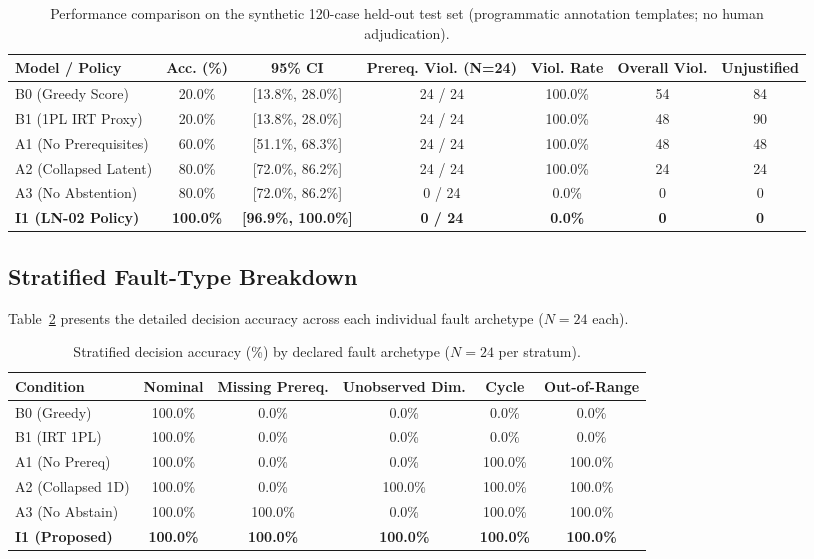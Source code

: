 \documentclass[11pt,a4paper]{article}
\begin{document}
\begin{table}[htbp]
\centering
\small
\caption{Performance comparison on the synthetic 120-case held-out test set (programmatic annotation templates; no human adjudication).}
\label{tab:holdout-main}
\begin{tabular}{lcccccc}
\toprule
\textbf{Model / Policy} & \textbf{Acc. (\%)} & \textbf{95\% CI} & \textbf{Prereq. Viol. (N=24)} & \textbf{Viol. Rate} & \textbf{Overall Viol.} & \textbf{Unjustified} \\
\midrule
B0 (Greedy Score)       & 20.0\% & [13.8\%, 28.0\%] & 24 / 24 & 100.0\% & 54 & 84 \\
B1 (1PL IRT Proxy)      & 20.0\% & [13.8\%, 28.0\%] & 24 / 24 & 100.0\% & 48 & 90 \\
A1 (No Prerequisites)   & 60.0\% & [51.1\%, 68.3\%] & 24 / 24 & 100.0\% & 48 & 48 \\
A2 (Collapsed Latent)   & 80.0\% & [72.0\%, 86.2\%] & 24 / 24 & 100.0\% & 24 & 24 \\
A3 (No Abstention)      & 80.0\% & [72.0\%, 86.2\%] &  0 / 24 &   0.0\% &  0 &  0 \\
\midrule
\textbf{I1 (LN-02 Policy)} & \textbf{100.0\%} & \textbf{[96.9\%, 100.0\%]} & \textbf{0 / 24} & \textbf{0.0\%} & \textbf{0} & \textbf{0} \\
\bottomrule
\end{tabular}
\end{table}

\subsection{Stratified Fault-Type Breakdown}

Table~\ref{tab:fault-breakdown} presents the detailed decision accuracy across each individual fault archetype ($N=24$ each).

\begin{table}[htbp]
\centering
\small
\caption{Stratified decision accuracy (\%) by declared fault archetype ($N=24$ per stratum).}
\label{tab:fault-breakdown}
\begin{tabular}{lccccc}
\toprule
\textbf{Condition} & \textbf{Nominal} & \textbf{Missing Prereq.} & \textbf{Unobserved Dim.} & \textbf{Cycle} & \textbf{Out-of-Range} \\
\midrule
B0 (Greedy)        & 100.0\% &   0.0\% &   0.0\% &   0.0\% &   0.0\% \\
B1 (IRT 1PL)       & 100.0\% &   0.0\% &   0.0\% &   0.0\% &   0.0\% \\
A1 (No Prereq)     & 100.0\% &   0.0\% &   0.0\% & 100.0\% & 100.0\% \\
A2 (Collapsed 1D)  & 100.0\% &   0.0\% & 100.0\% & 100.0\% & 100.0\% \\
A3 (No Abstain)    & 100.0\% & 100.0\% &   0.0\% & 100.0\% & 100.0\% \\
\midrule
\textbf{I1 (Proposed)} & \textbf{100.0\%} & \textbf{100.0\%} & \textbf{100.0\%} & \textbf{100.0\%} & \textbf{100.0\%} \\
\bottomrule
\end{tabular}
\end{table}
\end{document}
